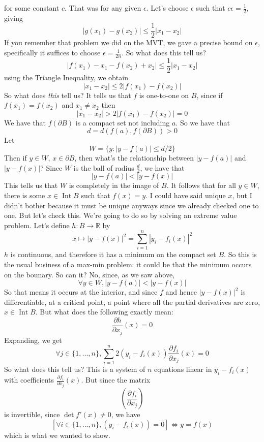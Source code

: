 \documentclass{article}
\DeclareMathOperator{\Int}{Int}
\newcommand{\reals}[0]{\mathbb{R}}
\newcommand{\prt}[2]{\frac{\partial #1}{\partial #2}}
\begin{document}
for some constant \(c\). That was for any given \(\epsilon\). Let's choose \(\epsilon\) such that \(c\epsilon = \frac{1}{2}\), giving
\[|g(x_1) - g(x_2)| \leq \frac{1}{2}|x_1 - x_2|\]
If you remember that problem we did on the MVT, we gave a precise bound on \(\epsilon\), specifically it suffices to choose \(\epsilon = \frac{1}{2n}\). So what does this tell us?
\[|f(x_1) - x_1 - f(x_2) + x_2| \leq \frac{1}{2}|x_1 - x_2|\]
using the Triangle Inequality, we obtain
\[|x_1 - x_2| \leq 2|f(x_1) - f(x_2)|\]
So what does \textit{this} tell us? It tells us that \(f\) is one-to-one on \(B\), since if \(f(x_1) = f(x_2)\) and \(x_1 \neq x_2\) then
\[|x_1 - x_2| > 2|f(x_1) - f(x_2)| = 0\]
We have that \(f(\partial B)\) is a compact set not including \(a\). So we have that
\[d = d(f(a), f(\partial B)) > 0\]
Let
\[W = \{y : |y - f(a)| \leq d/2\}\]
Then if \(y \in W\), \(x \in \partial B\), then what's the relationship between
\(|y - f(a)|\) and \(|y - f(x)|\)? Since \(W\) is the ball of radius \(\frac{d}{2}\), we have that
\[|y - f(a)| < |y - f(x)|\]
This tells us that \(W\) is completely in the image of \(B\). It follows that for all \(y \in W\), there is some \(x \in \Int B\) such that \(f(x) = y\). I could have said unique \(x\), but I didn't bother because it must be unique anyways since we already checked one to one. But let's check this. We're going to do so by solving an extreme value problem. Let's define \(h: B \to \reals\) by
\[x \mapsto |y - f(x)|^2 = \sum_{i = 1}^n|y_i - f_i(x)|^2\]
\(h\) is continuous, and therefore it has a minimum on the compact set \(B\). So this is the usual business of a max-min problem: it could be that the minimum occurs on the bounary. So can it? No, since, as we saw above,
\[\forall y \in W, |y - f(a)| < |y - f(x)|\]
So that means it occurs at the interior, and since \(f\) and hence \(|y - f(x)|^2\) is differentiable, at a critical point, a point where all the partial derivatives are zero, \(x \in \Int B\). But what does the following exactly mean:
\[\prt{h}{x_j}(x) = 0\]
Expanding, we get
\[\forall j \in \{1,...,n\}, \sum_{i = 1}^n2(y_i - f_i(x))\prt{f_i}{x_j}(x) = 0\]
So what does this tell us? This is a system of \(n\) equations linear in \(y_i - f_i(x)\) with coefficients \(\prt{f_i}{x_j}(x)\). But since the matrix
\[\left(\prt{f_i}{x_j}\right)\]
is invertible, since \(\det f'(x) \neq 0\), we have
\[[\forall i \in \{1,...,n\}, (y_i - f_i(x)) = 0] \iff y = f(x)\]
which is what we wanted to show.
\end{document}

